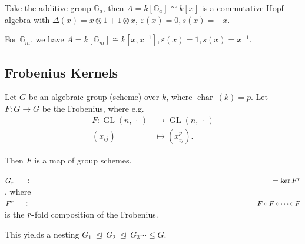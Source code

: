 \begin{example}

\begin{example}

Take the additive group \({\mathbb{G}}_a\), then
\(A = k[{\mathbb{G}}_a] \cong k[x]\) is a commutative Hopf algebra with
\(\Delta(x) = x\otimes 1 + 1\otimes x\),
\(\varepsilon(x) = 0, s(x) = -x\).

\end{example}

\end{example}

\begin{example}

\begin{example}

For \({\mathbb{G}}_m\), we have
\(A = k[{\mathbb{G}}_m] \cong k[x, x^{-1}], \varepsilon(x) = 1, s(x) = x^{-1}\).

\end{example}

\end{example}

\hypertarget{frobenius-kernels}{%
\subsection{Frobenius Kernels}\label{frobenius-kernels}}

Let \(G\) be an algebraic group (scheme) over \(k\), where
\(\operatorname{char}~(k) = p\). Let \(F:G\to G\) be the Frobenius,
where
e.g.~\begin{align*}   F:\operatorname{GL}(n, {\,\cdot\,}) &\to \operatorname{GL}(n, {\,\cdot\,})\\ (x_{ij}) & \mapsto (x_{ij}^p) .\end{align*}

Then \(F\) is a map of group schemes.

\begin{definition}

\begin{definition}

\(G_r \mathrel{\vcenter{:}}=\ker F^r\), where
\(F^r \mathrel{\vcenter{:}}= F\circ F \circ \cdots \circ F\) is the
\(r{\hbox{-}}\)fold composition of the Frobenius.

This yields a nesting
\(G_1 {~\trianglelefteq~}G_2 {~\trianglelefteq~}G_3 \cdots \leq G\).

\end{definition}

\end{definition}

